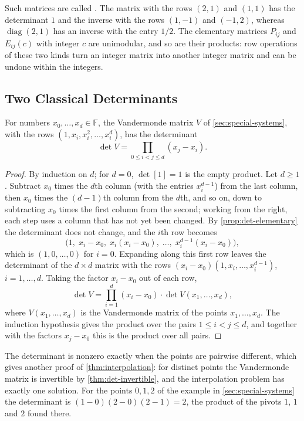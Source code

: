 Such matrices are called . The matrix with the rows $(2,1)$ and $(1,1)$ has the determinant $1$ and the inverse with the rows $(1,-1)$ and $(-1,2)$, whereas $\operatorname{diag}(2,1)$ has an inverse with the entry $1/2$. The elementary matrices $P_{ij}$ and $E_{ij}(c)$ with integer $c$ are unimodular, and so are their products: row operations of these two kinds turn an integer matrix into another integer matrix and can be undone within the integers.

\subsection{Two Classical Determinants}

\begin{theorem}
\label{thm:vandermonde-det}
For numbers $x_0,\ldots,x_d\in\mathbb F$, the Vandermonde matrix $V$ of \cref{sec:special-systems}, with the rows $(1,x_i,x_i^2,\ldots,x_i^d)$, has the determinant
\[
\det V=\prod_{0\le i<j\le d}(x_j-x_i).
\]
\end{theorem}

\begin{proof}
By induction on $d$; for $d=0$, $\det[1]=1$ is the empty product. Let $d\ge1$. Subtract $x_0$ times the $d$th column (with the entries $x_i^{d-1}$) from the last column, then $x_0$ times the $(d-1)$th column from the $d$th, and so on, down to subtracting $x_0$ times the first column from the second; working from the right, each step uses a column that has not yet been changed. By \cref{prop:det-elementary} the determinant does not change, and the $i$th row becomes
\[
\bigl(1,\;x_i-x_0,\;x_i(x_i-x_0),\;\ldots,\;x_i^{d-1}(x_i-x_0)\bigr),
\]
which is $(1,0,\ldots,0)$ for $i=0$. Expanding along this first row leaves the determinant of the $d\times d$ matrix with the rows $(x_i-x_0)(1,x_i,\ldots,x_i^{d-1})$, $i=1,\ldots,d$. Taking the factor $x_i-x_0$ out of each row,
\[
\det V=\prod_{i=1}^d(x_i-x_0)\cdot\det V(x_1,\ldots,x_d),
\]
where $V(x_1,\ldots,x_d)$ is the Vandermonde matrix of the points $x_1,\ldots,x_d$. The induction hypothesis gives the product over the pairs $1\le i<j\le d$, and together with the factors $x_j-x_0$ this is the product over all pairs.
\end{proof}

The determinant is nonzero exactly when the points are pairwise different, which gives another proof of \cref{thm:interpolation}: for distinct points the Vandermonde matrix is invertible by \cref{thm:det-invertible}, and the interpolation problem has exactly one solution. For the points $0,1,2$ of the example in \cref{sec:special-systems} the determinant is $(1-0)(2-0)(2-1)=2$, the product of the pivots $1$, $1$ and $2$ found there.

